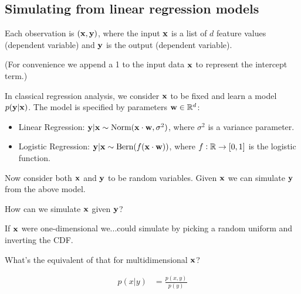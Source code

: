 \subsection{Simulating from linear regression models}

Each observation is $(\mathbf x, \mathbf y)$, where the input $\mathbf x$ is a list of $d$ feature values (dependent
variable) and $\mathbf y$ is the output (dependent variable).

(For convenience we append a 1 to the input data $\mathbf x$ to represent the intercept term.)

In classical regression analysis, we consider $\mathbf x$ to be fixed and learn a model $p(\mathbf y|\mathbf x)$. The
model is specified by parameters $\mathbf w \in \mathbb{R}^d$:

\begin{itemize}
\item Linear Regression: $\mathbf y|\mathbf x \sim \operatorname{\text{Norm}}(\mathbf x \cdot \mathbf w, \sigma^2)$, where $\sigma^2$ is a variance
  parameter.
\item Logistic Regression: $\mathbf y|\mathbf x \sim \operatorname{\text{Bern}}(f(\mathbf x \cdot \mathbf w))$, where $f: \mathbb{R} \to [0,1]$ is the logistic
  function.
\end{itemize}

Now consider both $\mathbf x$ and $\mathbf y$ to be random variables. Given $\mathbf x$ we can simulate $\mathbf y$ from the
above model.

How can we simulate $\mathbf x$ given $\mathbf y$?

If $\mathbf x$ were one-dimensional we...could simulate by picking a random uniform and inverting the CDF.

What's the equivalent of that for multidimensional $\mathbf x$?

\begin{align*}
  p(x|y) &= \frac{p(x, y)}{p(y)}
\end{align*}

